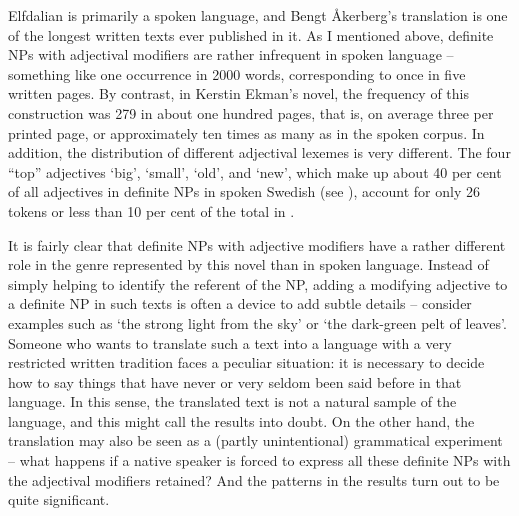 Elfdalian is primarily a spoken language, and Bengt Åkerberg’s translation is one of the longest written texts ever published in it. As I mentioned above, definite NPs with adjectival modifiers are rather infrequent in spoken language – something like one occurrence in 2000 words, corresponding to once in five written pages. By contrast, in Kerstin Ekman’s novel, the frequency of this construction was 279 in about one hundred pages, that is, on average three per printed page, or approximately ten times as many as in the spoken corpus. In addition, the distribution of different adjectival lexemes is very different. The four “top” adjectives ‘big’,  ‘small’,  ‘old’, and  ‘new’, which make up about 40 per cent of all adjectives in definite NPs in spoken Swedish (see ), account for only 26 tokens or less than 10 per cent of the total in .

It is fairly clear that definite NPs with adjective modifiers have a rather different role in the genre represented by this novel than in spoken language. Instead of simply helping to identify the referent of the NP, adding a modifying adjective to a definite NP in such texts is often a device to add subtle details – consider examples such as  ‘the strong light from the sky’ or  ‘the dark-green pelt of leaves’. Someone who wants to translate such a text into a language with a very restricted written tradition faces a peculiar situation: it is necessary to decide how to say things that have never or very seldom been said before in that language. In this sense, the translated text is not a natural sample of the language, and this might call the results into doubt. On the other hand, the translation may also be seen as a (partly unintentional) grammatical experiment – what happens if a native speaker is forced to express all these definite NPs with the adjectival modifiers retained? And the patterns in the results turn out to be quite significant.

